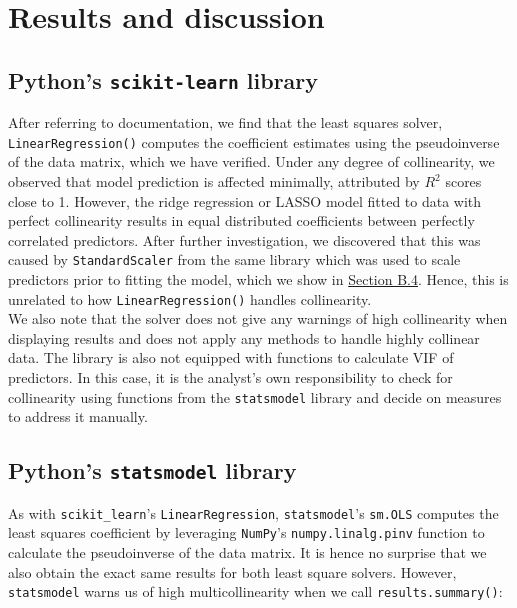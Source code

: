 \documentclass[12pt]{article}
\begin{document}
	
	\section{Results and discussion}
	\subsection{Python's \texttt{scikit-learn} library}
	
	After referring to documentation, we find that the least squares solver, \texttt{LinearRegression()} computes the coefficient estimates using the pseudoinverse of the data matrix, which we have verified. Under any degree of collinearity, we observed that model prediction is affected minimally, attributed by $R^2$ scores close to 1. However, the ridge regression or LASSO model fitted to data with perfect collinearity results in equal distributed coefficients between perfectly correlated predictors. After further investigation, we discovered that this was caused by \texttt{StandardScaler} from the same library which was used to scale predictors prior to fitting the model, which we show in \hyperref[sec:append4]{Section B.4}. Hence, this is unrelated to how \texttt{LinearRegression()} handles collinearity.\\
	
	We also note that the solver does not give any warnings of high collinearity when displaying results and does not apply any methods to handle highly collinear data. The library is also not equipped with functions to calculate VIF of predictors. In this case, it is the analyst's own responsibility to check for collinearity using functions from the \texttt{statsmodel} library and decide on measures to address it manually.
	
	\subsection{Python's \texttt{statsmodel} library}
	
	As with \texttt{scikit\_learn}'s \texttt{LinearRegression}, \texttt{statsmodel}'s \texttt{sm.OLS} computes the least squares coefficient by leveraging \texttt{NumPy}'s \texttt{numpy.linalg.pinv} function to calculate the pseudoinverse of the data matrix. It is hence no surprise that we also obtain the exact same results for both least square solvers. However, \texttt{statsmodel} warns us of high multicollinearity when we call \texttt{results.summary()}: \\
	
\end{document}
